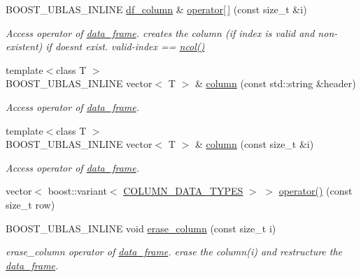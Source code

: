 \begin{DoxyCompactItemize}
B\+O\+O\+S\+T\+\_\+\+U\+B\+L\+A\+S\+\_\+\+I\+N\+L\+I\+NE \hyperlink{classboost_1_1numeric_1_1ublas_1_1df__column}{df\+\_\+column} \& \hyperlink{classboost_1_1numeric_1_1ublas_1_1data__frame_a58496ee7ebcb0c67457b2c0c476ecec4}{operator\mbox{[}$\,$\mbox{]}} (const size\+\_\+t \&i)
\begin{DoxyCompactList}\small\item\em Access operator of \hyperlink{classboost_1_1numeric_1_1ublas_1_1data__frame}{data\+\_\+frame}. creates the column (if index is valid and non-\/existent) if doesn\textquotesingle{}t exist. valid-\/index == {\ttfamily \hyperlink{classboost_1_1numeric_1_1ublas_1_1data__frame_adf7817e6cf0dcc7fa6d892a351b5c9a8}{ncol()}} \end{DoxyCompactList}\item 
{\footnotesize template$<$class T $>$ }\\B\+O\+O\+S\+T\+\_\+\+U\+B\+L\+A\+S\+\_\+\+I\+N\+L\+I\+NE vector$<$ T $>$ \& \hyperlink{classboost_1_1numeric_1_1ublas_1_1data__frame_a261a6b02e41c2d5c3e17c7a91c5cb2d5}{column} (const std\+::string \&header)
\begin{DoxyCompactList}\small\item\em Access operator of \hyperlink{classboost_1_1numeric_1_1ublas_1_1data__frame}{data\+\_\+frame}. \end{DoxyCompactList}\item 
{\footnotesize template$<$class T $>$ }\\B\+O\+O\+S\+T\+\_\+\+U\+B\+L\+A\+S\+\_\+\+I\+N\+L\+I\+NE vector$<$ T $>$ \& \hyperlink{classboost_1_1numeric_1_1ublas_1_1data__frame_ac7a4a31485c55e9b3254e1e62ea4c7a8}{column} (const size\+\_\+t \&i)
\begin{DoxyCompactList}\small\item\em Access operator of \hyperlink{classboost_1_1numeric_1_1ublas_1_1data__frame}{data\+\_\+frame}. \end{DoxyCompactList}\item 
vector$<$ boost\+::variant$<$ \hyperlink{df_8hpp_afef621cf30ef388830e03c82fe775aee}{C\+O\+L\+U\+M\+N\+\_\+\+D\+A\+T\+A\+\_\+\+T\+Y\+P\+ES} $>$ $>$ \hyperlink{classboost_1_1numeric_1_1ublas_1_1data__frame_aeb28ec6efedf6e3b30bc59f7fe0fa1bf}{operator()} (const size\+\_\+t row)
\item 
B\+O\+O\+S\+T\+\_\+\+U\+B\+L\+A\+S\+\_\+\+I\+N\+L\+I\+NE void \hyperlink{classboost_1_1numeric_1_1ublas_1_1data__frame_a751e376399080f1c09ddf8ad1e11e478}{erase\+\_\+column} (const size\+\_\+t i)
\begin{DoxyCompactList}\small\item\em erase\+\_\+column operator of \hyperlink{classboost_1_1numeric_1_1ublas_1_1data__frame}{data\+\_\+frame}. erase the column({\ttfamily i}) and restructure the \hyperlink{classboost_1_1numeric_1_1ublas_1_1data__frame}{data\+\_\+frame}. \end{DoxyCompactList}\item 

\end{DoxyCompactItemize}
